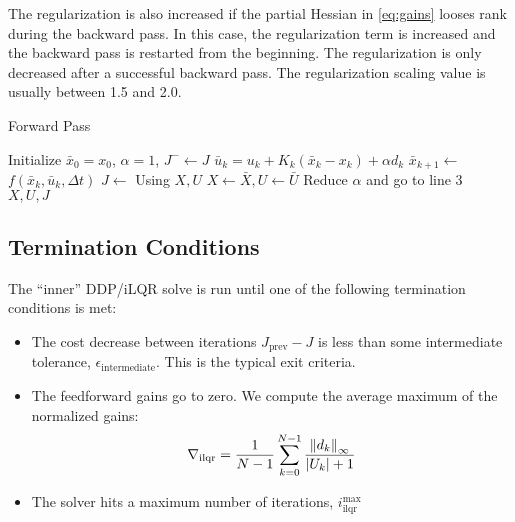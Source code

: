 \documentclass[../root.tex]{subfiles}
\begin{document}
    The regularization is also increased if the partial Hessian in
    \eqref{eq:gains} looses rank during the backward pass. In this case, the
    regularization term is increased and the backward pass is restarted from
    the beginning. The regularization is only decreased after a successful
    backward pass. The regularization scaling value is usually between 1.5
    and 2.0.

    \begin{algorithm}
    \begin{algorithmic}[1]
    \caption{Forward Pass} \label{alg:FP}
        \State Initialize $\bar{x}_0 = x_0$, $\alpha = 1$, $J^{-} \leftarrow J$
            \State $\bar{u}_k = u_k + K_k(\bar{x}_k - x_k) + \alpha d_k$
            \State $\bar{x}_{k+1} \leftarrow$ $f(\bar{x}_k, \bar{u}_k, \Delta t)$
        \EndFor
        \State $J \leftarrow$ Using $X, U$
            \State $X \leftarrow \bar{X}, U \leftarrow \bar{U}$
        \Else
            \State Reduce $\alpha$ and go to line 3
        \EndIf\\
        \Return $X,U,J$
    \EndFunction
    \end{algorithmic}
    \end{algorithm}


\subsection{Termination Conditions} \label{term_conditions}
The ``inner'' DDP/iLQR solve is run until one of the following termination
conditions is met:
\begin{itemize}
    \item The cost decrease between iterations $J_\text{prev} - J$ is less
    than some intermediate tolerance, $\epsilon_\text{intermediate}$. This is
    the typical exit criteria.
    \item The feedforward gains go to zero. We compute the average maximum of
    the normalized gains:
        \begin{equation} \label{eq:ilqr_grad}
            \nabla_\text{ilqr} = \frac{1}{N-1} \sum_{k=0}^{N-1} \frac{\norm{d_k}_\infty}{\abs{U_k}+1}   
        \end{equation}
    \item The solver hits a maximum number of iterations,
    $i^\text{max}_\text{ilqr}$
\end{itemize}
\end{document}
